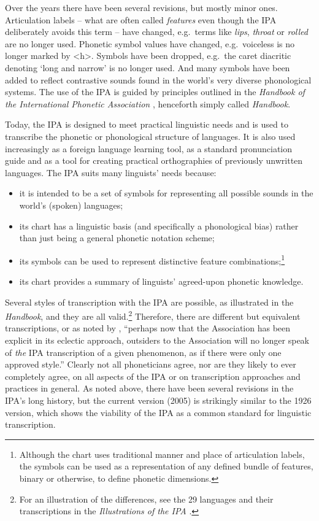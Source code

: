 Over the years there have been several revisions, but mostly minor ones. Articulation 
labels -- what are often called \textit{features} even though the IPA
deliberately avoids this term -- have changed, e.g.\ terms like \textit{lips}, \textit{throat}
or \textit{rolled} are no longer used. Phonetic symbol values have changed, e.g.\
voiceless is no longer marked by <h>. Symbols have been dropped, e.g.\ the
caret diacritic denoting `long and narrow' is no longer used. And many symbols
have been added to reflect contrastive sounds found in the world's very diverse
phonological systems. The use of the IPA is guided by principles outlined in 
the \textit{Handbook of the International Phonetic Association} \citep{IPA1999}, 
henceforth simply called \textit{Handbook}. 

Today, the IPA is designed to meet practical linguistic needs and is used to
transcribe the phonetic or phonological structure of languages. It is also used
increasingly as a foreign language learning tool, as a standard pronunciation
guide and as a tool for creating practical orthographies of previously unwritten
languages. The IPA suits many linguists' needs because:

\begin{itemize}

	\item it is intended to be a set of symbols for representing all possible
       sounds in the world's (spoken) languages;
	\item its chart has a linguistic basis (and specifically a phonological bias)
       rather than just being a general phonetic notation scheme;
	\item its symbols can be used to represent distinctive feature
       combinations;\footnote{Although the chart uses traditional manner and
       place of articulation labels, the symbols can be used as a representation
       of any defined bundle of features, binary or otherwise, to define
       phonetic dimensions.}
	\item its chart provides a summary of linguists' agreed-upon phonetic 
	knowledge.

\end{itemize}

Several styles of transcription with the IPA are possible, as illustrated in the
\textit{Handbook}, and they are all valid.\footnote{For an illustration of
the differences, see the 29 languages and their transcriptions in the
\textit{Illustrations of the IPA} \citep[41--154]{IPA1999}.} Therefore, there are 
different but equivalent transcriptions, or as noted by \citet[64]{Ladefoged1990a}, 
``perhaps now that the Association has been explicit in its eclectic approach, outsiders to the
Association will no longer speak of \textit{the} IPA transcription of a given
phenomenon, as if there were only one approved style.'' Clearly not all
phoneticians agree, nor are they likely to ever completely agree, on all aspects of the
IPA or on transcription approaches and practices in general. As noted above, 
there have been several revisions in the IPA's long history, but the current version (2005) is
strikingly similar to the 1926 version, which shows the viability of the IPA as a
common standard for linguistic transcription.


